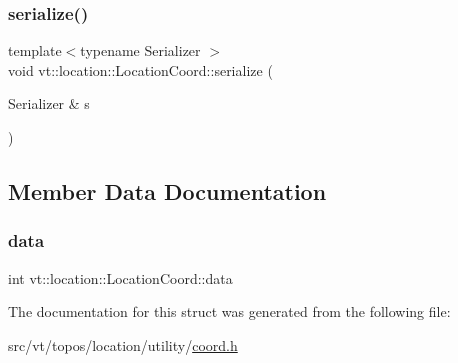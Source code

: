 \subsubsection{\texorpdfstring{serialize()}{serialize()}}
{\footnotesize\ttfamily template$<$typename Serializer $>$ \\
void vt\+::location\+::\+Location\+Coord\+::serialize (\begin{DoxyParamCaption}\item[{Serializer \&}]{s }\end{DoxyParamCaption})\hspace{0.3cm}{\ttfamily [inline]}}



\subsection{Member Data Documentation}
\mbox{\label{structvt_1_1location_1_1_location_coord_aa94c83bab2f01365b14852e7b80e6aec}} 
\subsubsection{\texorpdfstring{data}{data}}
{\footnotesize\ttfamily int vt\+::location\+::\+Location\+Coord\+::data}



The documentation for this struct was generated from the following file\+:\begin{DoxyCompactItemize}
\item 
src/vt/topos/location/utility/\hyperlink{coord_8h}{coord.\+h}\end{DoxyCompactItemize}
